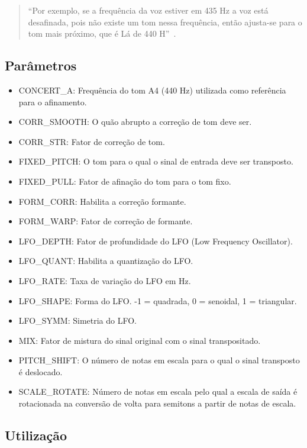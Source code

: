 \documentclass{sbrt}
\begin{document}
\begin{quote}
  ``Por exemplo, se a frequência da voz estiver em 435 Hz a voz está desafinada, pois não existe um tom nessa
  frequência, então ajusta-se para o tom mais próximo, que é Lá de 440 H''~\cite{deimplementaccao}.
\end{quote}

\subsection{Parâmetros}

\begin{itemize}
  \item CONCERT\_A: Frequência do tom A4 (440 Hz) utilizada como referência para o afinamento.
  \item CORR\_SMOOTH: O quão abrupto a correção de tom deve ser.
  \item CORR\_STR: Fator de correção de tom.
  \item FIXED\_PITCH: O tom para o qual o sinal de entrada deve ser transposto.
  \item FIXED\_PULL: Fator de afinação do tom para o tom fixo.
  \item FORM\_CORR: Habilita a correção formante.
  \item FORM\_WARP: Fator de correção de formante.
  \item LFO\_DEPTH: Fator de profundidade do LFO (Low Frequency Oscillator).
  \item LFO\_QUANT: Habilita a quantização do LFO.
  \item LFO\_RATE: Taxa de variação do LFO em Hz.
  \item LFO\_SHAPE: Forma do LFO. -1 = quadrada, 0 = senoidal, 1 = triangular.
  \item LFO\_SYMM: Simetria do LFO.
  \item MIX: Fator de mistura do sinal original com o sinal transpositado.
  \item PITCH\_SHIFT: O número de notas em escala para o qual o sinal transposto é deslocado.
  \item SCALE\_ROTATE: Número de notas em escala pelo qual a escala de saída é rotacionada na conversão de volta para
  semitons a partir de notas de escala.
\end{itemize}

\subsection{Utilização}
\end{document}

